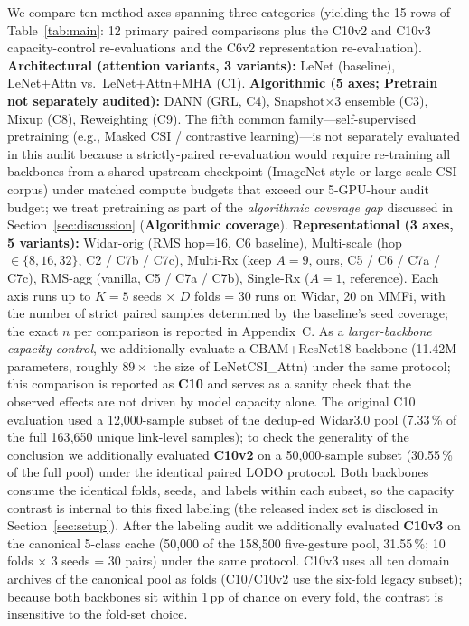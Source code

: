 \documentclass[11pt]{article}
\theoremstyle{definition}
\begin{document}
We compare ten method axes spanning three categories (yielding the 15 rows of Table~\ref{tab:main}: 12 primary paired comparisons plus the C10v2 and C10v3 capacity-control re-evaluations and the C6v2 representation re-evaluation). \textbf{Architectural (attention variants, 3 variants):} LeNet (baseline), LeNet+Attn vs.\ LeNet+Attn+MHA (C1). \textbf{Algorithmic (5 axes; Pretrain not separately audited):} DANN (GRL, C4), Snapshot$\times$3 ensemble (C3), Mixup (C8), Reweighting (C9). The fifth common family---self-supervised pretraining (e.g., Masked CSI / contrastive learning)---is not separately evaluated in this audit because a strictly-paired re-evaluation would require re-training all backbones from a shared upstream checkpoint (ImageNet-style or large-scale CSI corpus) under matched compute budgets that exceed our 5-GPU-hour audit budget; we treat pretraining as part of the \emph{algorithmic coverage gap} discussed in Section~\ref{sec:discussion} (\textbf{Algorithmic coverage}). \textbf{Representational (3 axes, 5 variants):} Widar-orig (RMS hop=16, C6 baseline), Multi-scale (hop $\in \{8, 16, 32\}$, C2 / C7b / C7c), Multi-Rx (keep $A=9$, ours, C5 / C6 / C7a / C7c), RMS-agg (vanilla, C5 / C7a / C7b), Single-Rx ($A=1$, reference). Each axis runs up to $K = 5$ seeds $\times$ $D$ folds = 30 runs on Widar, 20 on MMFi, with the number of strict paired samples determined by the baseline's seed coverage; the exact $n$ per comparison is reported in Appendix~C. As a \emph{larger-backbone capacity control}, we additionally evaluate a CBAM+ResNet18 backbone (11.42M parameters, roughly $89\times$ the size of LeNetCSI\_Attn) under the same protocol; this comparison is reported as \textbf{C10} and serves as a sanity check that the observed effects are not driven by model capacity alone. The original C10 evaluation used a 12{,}000-sample subset of the dedup-ed Widar3.0 pool (7.33\,\% of the full 163{,}650 unique link-level samples); to check the generality of the conclusion we additionally evaluated \textbf{C10v2} on a 50{,}000-sample subset (30.55\,\% of the full pool) under the identical paired LODO protocol. Both backbones consume the identical folds, seeds, and labels within each subset, so the capacity contrast is internal to this fixed labeling (the released index set is disclosed in Section~\ref{sec:setup}). After the labeling audit we additionally evaluated \textbf{C10v3} on the canonical 5-class cache (50{,}000 of the 158{,}500 five-gesture pool, 31.55\,\%; 10 folds $\times$ 3 seeds = 30 pairs) under the same protocol. C10v3 uses all ten domain archives of the canonical pool as folds (C10/C10v2 use the six-fold legacy subset); because both backbones sit within 1\,pp of chance on every fold, the contrast is insensitive to the fold-set choice.
\end{document}
